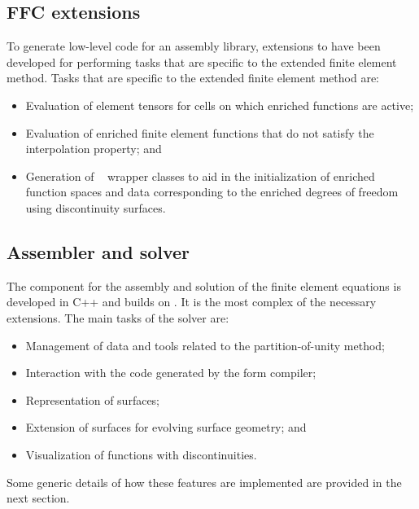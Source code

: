 \subsection{FFC extensions}

To generate low-level code for an assembly library, extensions to \ffc{}
have been developed for performing tasks that are specific to the extended
finite element method.  Tasks that are specific to the extended finite
element method are:
%
\begin{itemize}
  \item Evaluation of element tensors for cells on which enriched
  functions are active;

  \item Evaluation of enriched finite element functions that do not
  satisfy the interpolation property; and

  \item Generation of \dolfin~ wrapper classes to aid in the
  initialization of enriched function spaces and data corresponding to
  the enriched degrees of freedom using discontinuity surfaces.
\end{itemize}
\subsection{Assembler and solver}
%
The component for the assembly and solution of the finite element
equations is developed in C++ and builds on \dolfin{}. It is the most
complex of the necessary extensions. The main tasks of the solver are:
%
\begin{itemize}
  \item Management of data and tools related to the partition-of-unity
  method;

  \item Interaction with the code generated by the form compiler;

  \item Representation of surfaces;

  \item Extension of surfaces for evolving surface geometry; and

  \item Visualization of functions with discontinuities.
\end{itemize}
%
Some generic details of how these features are implemented are provided
in the next section.

